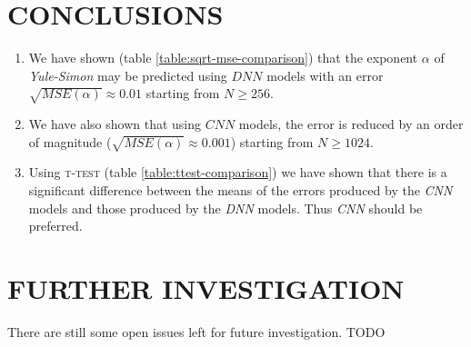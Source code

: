 \documentclass[a4paper, 12pt]{report}
\begin{document}
\section{CONCLUSIONS}

\begin{enumerate}
\small
    \item We have shown (table \ref{table:sqrt-mse-comparison}) that the exponent $\alpha$ of \textit{Yule-Simon} may be predicted using $DNN$ models with an error $\sqrt{MSE(\alpha)} \approx 0.01$ starting from $N \geq 256$.
    
    \item We have also shown that using $CNN$ models, the error is reduced by an order of magnitude ($\sqrt{MSE(\alpha)} \approx 0.001$) starting from $N \geq 1024$.
    
    \item Using \textsc{t-test} (table \ref{table:ttest-comparison}) we have shown that there is a significant difference between the means of the errors produced by the \textit{CNN} models and those produced by the \textit{DNN} models. Thus \textit{CNN} should be preferred.
\end{enumerate}

\section{FURTHER INVESTIGATION}
There are still some open issues left for future investigation.
TODO

\printbibliography
\end{document}
